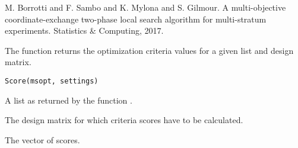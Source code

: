 \documentclass[a4paper]{book}
\begin{document}
%
\begin{References}\relax
M. Borrotti and F. Sambo and K. Mylona and S. Gilmour. A multi-objective
coordinate-exchange two-phase local search algorithm for multi-stratum
experiments. Statistics \& Computing, 2017.
\end{References}
%
\begin{Description}\relax
The  function returns the optimization criteria values for a
given  list and design matrix.
\end{Description}
%
\begin{Usage}
\begin{verbatim}
Score(msopt, settings)
\end{verbatim}
\end{Usage}
%
\begin{Arguments}
\begin{ldescription}
\item[\code{msopt}] A list as returned by the function .

\item[\code{settings}] The design matrix for which criteria scores have to be calculated.
\end{ldescription}
\end{Arguments}
%
\begin{Value}
The vector of scores.
\end{Value}
%
\end{document}
